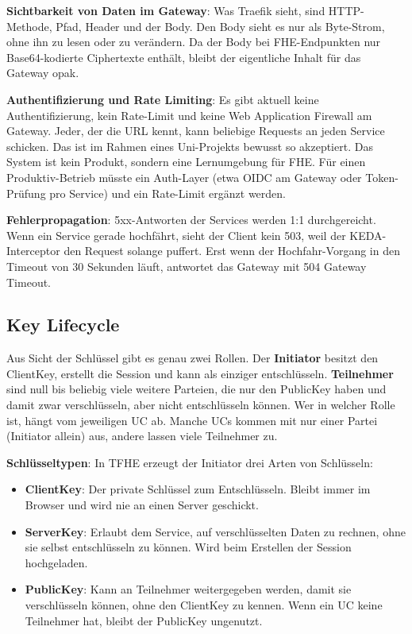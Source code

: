 \textbf{Sichtbarkeit von Daten im Gateway}:
Was Traefik sieht, sind HTTP-Methode, Pfad, Header und der Body. Den Body sieht es nur als Byte-Strom, ohne ihn zu lesen oder zu verändern. Da der Body bei FHE-Endpunkten nur Base64-kodierte Ciphertexte enthält, bleibt der eigentliche Inhalt für das Gateway opak.

\textbf{Authentifizierung und Rate Limiting}:
Es gibt aktuell keine Authentifizierung, kein Rate-Limit und keine Web Application Firewall am Gateway. Jeder, der die URL kennt, kann beliebige Requests an jeden Service schicken. Das ist im Rahmen eines Uni-Projekts bewusst so akzeptiert. Das System ist kein Produkt, sondern eine Lernumgebung für FHE. Für einen Produktiv-Betrieb müsste ein Auth-Layer (etwa OIDC am Gateway oder Token-Prüfung pro Service) und ein Rate-Limit ergänzt werden.

\textbf{Fehlerpropagation}:
5xx-Antworten der Services werden 1:1 durchgereicht. Wenn ein Service gerade hochfährt, sieht der Client kein 503, weil der KEDA-Interceptor den Request solange puffert. Erst wenn der Hochfahr-Vorgang in den Timeout von 30 Sekunden läuft, antwortet das Gateway mit 504 Gateway Timeout.

\subsection{Key Lifecycle}
\label{sub:key_lifecycle}

Aus Sicht der Schlüssel gibt es genau zwei Rollen. Der \textbf{Initiator} besitzt den ClientKey, erstellt die Session und kann als einziger entschlüsseln. \textbf{Teilnehmer} sind null bis beliebig viele weitere Parteien, die nur den PublicKey haben und damit zwar verschlüsseln, aber nicht entschlüsseln können. Wer in welcher Rolle ist, hängt vom jeweiligen UC ab. Manche UCs kommen mit nur einer Partei (Initiator allein) aus, andere lassen viele Teilnehmer zu.

\textbf{Schlüsseltypen}:
In TFHE erzeugt der Initiator drei Arten von Schlüsseln:

\begin{itemize}
    \item \textbf{ClientKey}: Der private Schlüssel zum Entschlüsseln. Bleibt immer im Browser und wird nie an einen Server geschickt.
    \item \textbf{ServerKey}: Erlaubt dem Service, auf verschlüsselten Daten zu rechnen, ohne sie selbst entschlüsseln zu können. Wird beim Erstellen der Session hochgeladen.
    \item \textbf{PublicKey}: Kann an Teilnehmer weitergegeben werden, damit sie verschlüsseln können, ohne den ClientKey zu kennen. Wenn ein UC keine Teilnehmer hat, bleibt der PublicKey ungenutzt.
\end{itemize}

